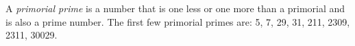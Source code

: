 \documentclass[12pt]{article}
\begin{document}
A {\em primorial prime} is a number that is one less or one more than a primorial and is also a prime number. The first few primorial primes are: 5, 7, 29, 31, 211, 2309, 2311, 30029.
\end{document}
